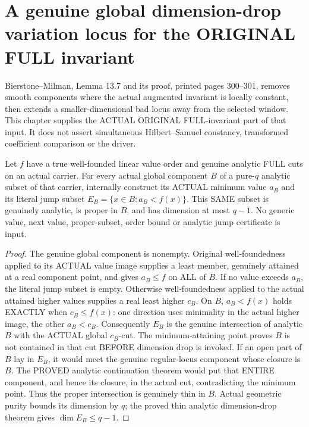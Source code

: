 \section{A genuine global dimension-drop variation locus for the ORIGINAL FULL invariant}

Bierstone--Milman\cite{bierstone-milman97-invent-math}, Lemma 13.7 and its
proof, printed pages 300--301, removes smooth components where the actual
augmented invariant is locally constant, then extends a smaller-dimensional
bad locus away from the selected window. This chapter supplies the ACTUAL
ORIGINAL FULL-invariant part of that input. It does not assert simultaneous
Hilbert--Samuel constancy, transformed coefficient comparison or the driver.

\begin{lemma}
\label{hir:actual-full-value-component-proper-analytic-jump}
\leanok
Let $f$ have a true well-founded linear value order and genuine analytic FULL
cuts on an actual carrier. For every actual global component $B$ of a
pure-$q$ analytic subset of that carrier, internally construct its ACTUAL
minimum value $a_B$ and its literal jump subset
$E_B=\{x\in B:a_B<f(x)\}$. This SAME subset is genuinely analytic, is proper
in $B$, and has dimension at most $q-1$. No generic value, next value,
proper-subset, order bound or analytic jump certificate is input.
\end{lemma}
\begin{proof}
The genuine global component is nonempty. Original well-foundedness applied
to its ACTUAL value image supplies a least member, genuinely attained at a
real component point, and gives $a_B\le f$ on ALL of $B$. If no value exceeds
$a_B$, the literal jump subset is empty. Otherwise well-foundedness applied
to the actual attained higher values supplies a real least higher $c_B$.
On $B$, $a_B<f(x)$ holds EXACTLY when $c_B\le f(x)$: one direction uses
minimality in the actual higher image, the other $a_B<c_B$. Consequently
$E_B$ is the genuine intersection of analytic $B$ with the ACTUAL global
$c_B$-cut. The minimum-attaining point proves $B$ is not contained in that
cut BEFORE dimension drop is invoked. If an open part of $B$ lay in $E_B$,
it would meet the genuine regular-locus component whose closure is $B$.
The PROVED analytic continuation theorem would put that ENTIRE component,
and hence its closure, in the actual cut, contradicting the minimum point.
Thus the proper intersection is genuinely thin in $B$. Actual geometric
purity bounds its dimension by $q$; the proved thin analytic dimension-drop
theorem gives $\dim E_B\le q-1$.
\end{proof}

